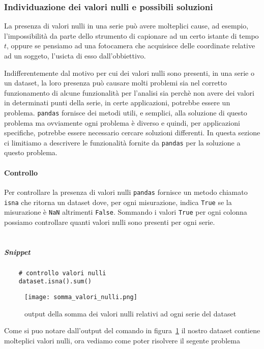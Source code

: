 \subsubsection{Individuazione dei valori nulli e possibili soluzioni}
La presenza di valori nulli in una serie può avere molteplici cause, ad esempio,
l'impossibilità da parte dello strumento di capionare ad un certo istante di tempo $t$,
oppure se pensiamo ad una fotocamera che acquisisce delle coordinate relative ad un soggeto,
l'usicta di esso dall'obbiettivo.

Indifferentemente dal motivo per cui dei valori nulli sono presenti, 
in una serie o un dataset, la loro presenza può causare molti
problemi sia nel corretto funzionamento di alcune funzionalità per l'analisi sia perchè
non avere dei valori in determinati punti della serie, in certe applicazioni, potrebbe
essere un problema. \texttt{pandas} fornisce dei metodi utili, e semplici, alla soluzione di questo
problema ma ovviamente ogni problema è diverso e quindi, per applicazioni specifiche,
potrebbe essere necessario cercare soluzioni differenti. In questa sezione ci limitiamo
a descrivere le funzionalità fornite da \texttt{pandas} per la soluzione a questo problema.

\paragraph{Controllo}
Per controllare la presenza di valori nulli \texttt{pandas} fornisce un metodo chiamato
\texttt{isna} che ritorna un dataset dove, per ogni misurazione, indica \texttt{True}
se la misurazione è \texttt{NaN} altrimenti \texttt{False}. Sommando i valori \texttt{True}
per ogni colonna possiamo controllare quanti valori nulli sono presenti per ogni serie.\\
\\
\subparagraph*{Snippet}
\begin{verbatim}
    # controllo valori nulli
    dataset.isna().sum()
\end{verbatim}
\begin{figure}[h!]
    \centering
    \texttt{[image: somma\_valori\_nulli.png]}
    \caption{output della somma dei valori nulli relativi ad ogni serie del dataset}
    \label{fig:sum_null}
\end{figure}
Come si puo notare dall'output del comando in figura~\ref*{fig:sum_null}
il nostro dataset contiene molteplici valori nulli, ora vediamo come poter risolvere
il segente problema

